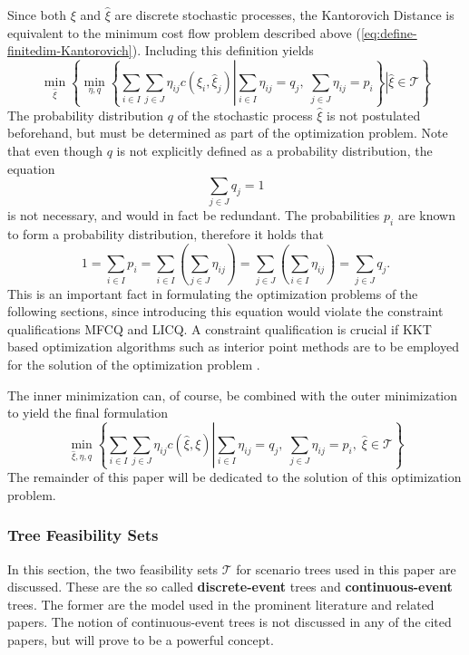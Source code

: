 Since both $\xi$ and $\hat{\xi}$ are discrete stochastic processes, the Kantorovich Distance is equivalent to the minimum cost flow problem described above (\ref{eq:define-finitedim-Kantorovich}).
Including this definition yields
\begin{equation}
  \label{eq:symbolic-optimization-with-minflow}
  \min_{\hat{\xi}}\left\{\min_{\eta,q}\left\{\sum_{i\in I}\sum_{j\in J}\eta_{ij}c(\xi_i,\hat{\xi}_j)\left|\sum_{i\in I}\eta_{ij}=q_j,\;\sum_{j\in J}\eta_{ij}=p_i\right.\right\}\left|\hat{\xi} \in \mathcal{T}\right.\right\}
\end{equation}
The probability distribution $q$ of the stochastic process $\hat{\xi}$ is not postulated beforehand, but must be determined as part of the optimization problem. Note that even though $q$ is not explicitly defined as a probability distribution, the equation
\begin{equation}
  \label{eq:q-schliessbedingung}
  \sum_{j\in J} q_j = 1
\end{equation}
is not necessary, and would in fact be redundant. The probabilities $p_i$ are known to form a probability distribution, therefore it holds that
\begin{equation}
  \label{eq:proof-sum-q-redundant}
  1 = \sum_{i\in I}p_i = \sum_{i\in I}\left(\sum_{j\in J}\eta_{ij}\right)=\sum_{j\in J}\left(\sum_{i\in I}\eta_{ij}\right)=\sum_{j\in J} q_j.
\end{equation}
This is an important fact in formulating the optimization problems of the following sections, since introducing this equation would violate the constraint qualifications MFCQ and LICQ.
A constraint qualification is crucial if KKT based optimization algorithms such as interior point methods are to be employed for the solution of the optimization problem \cite{Jongen2004}.

The inner minimization can, of course, be combined with the outer minimization to yield the final formulation
\begin{equation}
  \label{eq:symbolic-optimization-with-minflow2}
  \min_{\hat{\xi},\eta,q}\left\{\sum_{i\in I}\sum_{j\in J}\eta_{ij}c(\hat{\xi}, \xi)\left|\sum_{i\in I}\eta_{ij}=q_j,\;\sum_{j\in J}\eta_{ij}=p_i,\;\hat{\xi} \in \mathcal{T}\right.\right\}
\end{equation}
The remainder of this paper will be dedicated to the solution of this optimization problem.
\subsubsection{Tree Feasibility Sets}
\label{sec:tree-feas-sets}
In this section, the two feasibility sets $\mathcal{T}$ for scenario trees used in this paper are discussed.
These are the so called \textbf{discrete-event} trees and \textbf{continuous-event} trees.
The former are the model used in the prominent literature \cite{Dupacova2003} and related papers.
The notion of continuous-event trees is not discussed in any of the cited papers, but will prove to be a powerful concept.

